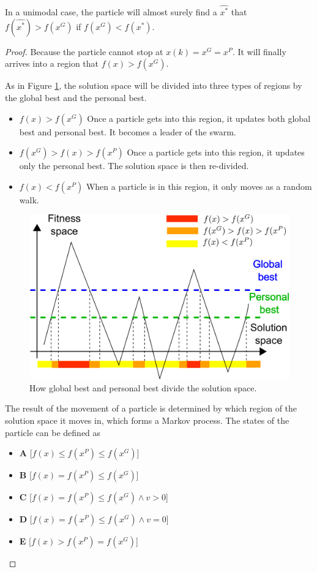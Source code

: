 \begin{mythm}
\label{thm:unimodal:particle:better}
In a unimodal case, the particle will almost surely find a $ \hat{x^{*}} $ that $ f(\hat{x^{*}}) > f(x^{G}) $ if $ f( x^{G} ) < f( x^{*}) $.
\begin{proof}
Because the particle cannot stop at $ x(k) = x^{G} = x^{P} $.
It will finally arrives into a region that $ f(x) > f(x^{G}) $.

As in Figure \ref{fig:categorize_regions}, the solution space will be divided into three types of regions by the global best and the personal best.
\begin{itemize}
\item $ f(x) > f(x^G) $
Once a particle gets into this region, it updates both global best and personal best. 
It becomes a leader of the swarm.
\item $ f(x^{G}) > f(x) > f(x^{P}) $
Once a particle gets into this region, it updates only the personal best.
The solution space is then re-divided.
\item $ f(x) < f(x^{P}) $
When a particle is in this region, it only moves as a random walk.
\end{itemize}

\begin{figure}
\centering
\includegraphics[width=0.7\linewidth]{./fig/categorize_regions}
\caption{How global best and personal best divide the solution space.}
\label{fig:categorize_regions}
\end{figure}

The result of the movement of a particle is determined by which region of the solution space it moves in, which forms a Markov process.
The states of the particle can be defined as
\begin{itemize}
\item \textbf{A} [$ f(x) \leq f(x^{P}) \leq f(x^{G}) $]
\item \textbf{B} [$ f(x) = f(x^{P}) \leq f(x^{G}) $] 
\item \textbf{C} [$ f(x) = f(x^{P}) \leq f(x^{G}) \land v > 0 $]
\item \textbf{D} [$ f(x) = f(x^{P}) \leq f(x^{G}) \land v = 0 $]
\item \textbf{E} [$ f(x) > f(x^{P}) = f(x^{G}) $]
\end{itemize}


\end{proof}
\end{mythm}
